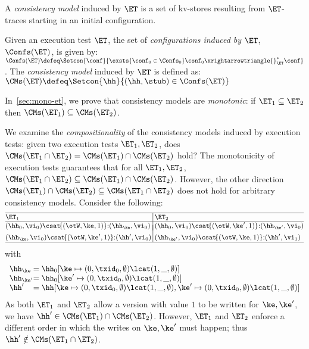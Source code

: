 A \emph{consistency model} induced by $\ET$ is a set of kv-stores
resulting from $\ET$-traces starting in an 
initial configuration. 

\begin{definition}
\label{def:cm}
Given an execution test $\ET$,  
the set of \emph{configurations induced by $\ET$},  $\Confs(\ET)$, is   given by: 
\(
\Confs(\ET)\defeq 
\Setcon{ \conf}{ 
	\exsts{\conf_0 \in \Confs_0}
	\conf_0 \xrightarrowtriangle{}_{\ET}^{*} \conf
}
\).
The \emph{consistency model} induced by $\ET$ is defined as:
\( 
\CMs(\ET) \defeq \Setcon{ \hh }{ (\hh, \stub) \in \Confs(\ET) }
\)
\end{definition}


\noindent In~\cref{sec:mono-et}, we prove that consistency models are 
\emph{monotonic}: 
if  $\ET_1 \subseteq \ET_2$ then $\CMs(\ET_1) \subseteq \CMs(\ET_2)$.

We examine the \emph{compositionality} of the consistency models induced by execution tests:  
\ie given two execution tests $\ET_1, \ET_2$, does 
$\CMs(\ET_1 \cap \ET_2) = \CMs(\ET_1) \cap \CMs(\ET_2)$ hold? 
The monotonicity of execution tests guarantees that 
 for all $\ET_1, \ET_2$, \( \CMs(\ET_1 \cap \ET_2) \subseteq \CMs(\ET_1) \cap \CMs(\ET_2) \). 
However, the other direction \( \CMs(\ET_1) \cap \CMs(\ET_2) \subseteq \CMs(\ET_1 \cap \ET_2) \) does not hold for arbitrary consistency models.
Consider the following:
\[
\small
\begin{array}{@{}l @{\hspace{2pt}} | @{\hspace{2pt}} l@{}}
    \hline
    \ET_1 & \ET_2 \\
%    
    \hline
    (\hh_{0}, \vi_{0}) \csat\! \{(\otW, \ke, 1)\} {:} ( \hh_{\ke}, \vi_{0})
    &
    (\hh_{0}, \vi_{0}) \csat\! \{(\otW, \ke', 1)\} {:} ( \hh_{\ke'}, \vi_{0}) 
    \vspace*{-7pt}\\\\
    (\hh_{\ke}, \vi_{0}) \csat  \!\{(\otW, \ke', 1)\} {:} (\hh',\vi_{0}) 
    &
    (\hh_{\ke'}, \vi_{0}) \csat \!\{(\otW, \ke, 1)\} {:} (\hh',\vi_{1}) 
    \\
\hline
\end{array}
\]
with 
\[
    \begin{array}{l@{} l}
    \hh_{\ke} & = \hh_{0}[\ke \mapsto (0, \txid_{0}, \emptyset) \lcat (1, \_, \emptyset)] \\
    \hh_{\ke'} & = \hh_{0}[\ke' \mapsto (0, \txid_{0}, \emptyset) \lcat (1, \_, \emptyset)] \\
    \hh' & = \hh[\ke \mapsto (0, \txid_{0}, \emptyset) \lcat (1, \_, \emptyset) 
                ,\ke' \mapsto (0, \txid_{0}, \emptyset) \lcat (1, \_, \emptyset)] \\
\end{array}
\]
As both $\ET_1$ and $\ET_2$ allow a version with value $1$ to be written for 
$\ke, \ke'$,  we have $\hh' \in \CMs(\ET_1) \cap \CMs(\ET_2)$. 
However, $\ET_1$ and $\ET_2$ enforce a different order in which the writes on $\ke, \ke'$ must happen; 
thus $\hh' \notin \CMs(\ET_1 \cap \ET_2)$. 


